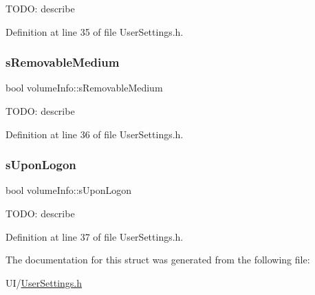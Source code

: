 T\+O\+DO\+: describe 

Definition at line 35 of file User\+Settings.\+h.

\mbox{\label{structvolume_info_afb218594cff74c3c73e9a8caa19468b6}} 
\subsubsection{\texorpdfstring{s\+Removable\+Medium}{sRemovableMedium}}
{\footnotesize\ttfamily bool volume\+Info\+::s\+Removable\+Medium}

T\+O\+DO\+: describe 

Definition at line 36 of file User\+Settings.\+h.

\mbox{\label{structvolume_info_ad49a2d984dc6afc9afdda5cfa4a5251f}} 
\subsubsection{\texorpdfstring{s\+Upon\+Logon}{sUponLogon}}
{\footnotesize\ttfamily bool volume\+Info\+::s\+Upon\+Logon}

T\+O\+DO\+: describe 

Definition at line 37 of file User\+Settings.\+h.



The documentation for this struct was generated from the following file\+:\begin{DoxyCompactItemize}
\item 
U\+I/\hyperlink{_user_settings_8h}{User\+Settings.\+h}\end{DoxyCompactItemize}

